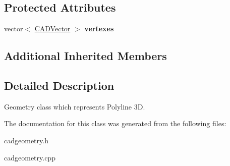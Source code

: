 \subsection*{Protected Attributes}
\begin{DoxyCompactItemize}
\item 
vector$<$ \hyperlink{class_c_a_d_vector}{C\+A\+D\+Vector} $>$ {\bfseries vertexes}\hypertarget{class_c_a_d_polyline3_d_a29e6b837c98234b4ac27f063855e3688}{}\label{class_c_a_d_polyline3_d_a29e6b837c98234b4ac27f063855e3688}

\end{DoxyCompactItemize}
\subsection*{Additional Inherited Members}


\subsection{Detailed Description}
Geometry class which represents Polyline 3D. 

The documentation for this class was generated from the following files\+:\begin{DoxyCompactItemize}
\item 
cadgeometry.\+h\item 
cadgeometry.\+cpp\end{DoxyCompactItemize}
